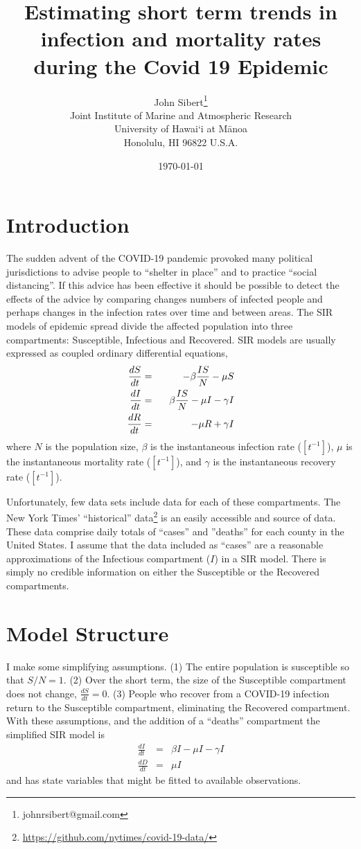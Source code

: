 \documentclass[12pt,letterpaper]{article}
\title{Estimating short term trends in infection and mortality rates
during the Covid 19 Epidemic}
\author{
John Sibert\thanks{johnrsibert@gmail.com}\\
Joint Institute of Marine and Atmospheric Research\\
University of Hawai`i at M\={a}noa\\
Honolulu, HI  96822 U.S.A.\\[0.125in]
\date{\today}
}
\newcommand\doublespacing{\baselineskip=1.6\normalbaselineskip}
\begin{document}
\maketitle

\doublespacing

\section*{Introduction}

The sudden advent of the COVID-19 pandemic provoked many political
jurisdictions to advise people to ``shelter in place'' and to practice
``social distancing''. If this advice has been effective it should be
possible to detect the effects of the advice by comparing changes
numbers of infected people and perhaps changes in the infection rates
over time and
between areas. The SIR models of epidemic spread divide the affected
population into three compartments: 
Susceptible, Infectious and Recovered.
SIR models are
usually expressed as coupled ordinary differential equations,
\begin{eqnarray}
\label{eqn:SIR}
\frac{dS}{dt} &=& -\beta\frac{IS}{N} - \mu S\\
\frac{dI}{dt} &=& \hphantom{-}\beta\frac{IS}{N} - \mu I -\gamma I\\
\frac{dR}{dt} &=&  -\mu R +\gamma I
\end{eqnarray}
where $N$ is the population size, $\beta$ is the instantaneous
infection rate ($[t^{-1}]$), $\mu$ is the instantaneous mortality rate
($[t^{-1}]$),  and $\gamma$ is the instantaneous recovery rate
($[t^{-1}]$).  

Unfortunately, few data sets include data for each of
these compartments. 
The New York Times' ``historical'' 
data\footnote{\label{ff:nyt}\url{https://github.com/nytimes/covid-19-data/}}
is an easily accessible and source of data. These
data comprise daily totals of ``cases'' and ''deaths'' for each county
in the United States. I assume that the data included as ``cases'' are
a reasonable approximations of the Infectious compartment ($I$) in a SIR model. 
There is simply no credible information on either the Susceptible or
the Recovered compartments.

\section*{Model Structure}
I make some simplifying assumptions. (1) The entire population is
susceptible so that $S/N = 1$. (2) Over the short term, the size of the
Susceptible compartment does not change, $\frac{dS}{dt} = 0$.
(3) People who recover from a COVID-19 infection return to the Susceptible
compartment, eliminating the Recovered compartment. 
With these assumptions, and the addition of a ``deaths''
compartment the simplified SIR model is
\begin{eqnarray}
\label{eqn:sSIR}
\frac{dI}{dt} &=&  \beta I - \mu I -\gamma I\\
\frac{dD}{dt} &=& \mu I
\end{eqnarray}
and has state variables that might be fitted to available observations.
\end{document}
